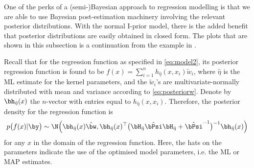 One of the perks of a (semi-)Bayesian approach to regression modelling is that we are able to use Bayesian post-estimation machinery involving the relevant posterior distributions.
With the normal I-prior model, there is the added benefit that posterior distributions are easily obtained in closed form.
The plots that are shown in this subsection is a continuation from the example in .

Recall that for the regression function as specified in \eqref{eq:model2}, its posterior regression function is found to be $f(x) = \sum_{i=1}^n h_{\hat\eta}(x,x_i)\tilde w_i$, where $\hat\eta$ is the ML estimate for the kernel parameters, and the $\tilde w_i$'s are multivariate-normally distributed with mean and variance according to \eqref{eq:posteriorw}.
Denote by $\bh_{\hat\eta}(x)$ the $n$-vector with entries equal to $h_{\hat\eta}(x,x_i)$.
Therefore, the posterior density for the regression function is
\begin{align}
  p\big(f(x) | \by \big) \sim \N \Big( 
  \bh_{\hat\eta}(x)\hat\bw, 
  \bh_{\hat\eta}(x)^\top \big(\bH_{\hat\eta}\hat\bPsi\bH_{\hat\eta} + \hat\bPsi^{-1}\big)^{-1} \bh_{\hat\eta}(x) 
  \Big)
\end{align}
for any $x$ in the domain of the regression function.
Here, the hats on the parameters indicate the use of the optimised model parameters, i.e. the ML or MAP estimates.

